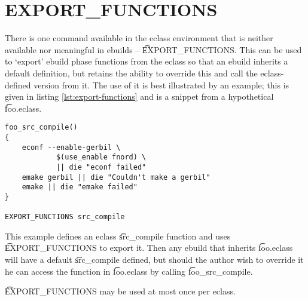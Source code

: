 \section{EXPORT\_FUNCTIONS}

There is one command available in the eclass environment that is neither available nor meaningful
in ebuilds -- \t{EXPORT\_FUNCTIONS}. This can be used to `export' ebuild phase functions from the
eclass so that an ebuild inherits a default definition, but retains the ability to override this and
call the eclass-defined version from it. The use of it is best illustrated by an example; this is
given in listing \ref{lst:export-functions} and is a snippet from a hypothetical \t{foo.eclass}.

\begin{lstlisting}[float,caption=EXPORT\_FUNCTIONS example: foo.eclass,label=lst:export-functions]
foo_src_compile()
{
    econf --enable-gerbil \
            $(use_enable fnord) \
            || die "econf failed"
    emake gerbil || die "Couldn't make a gerbil"
    emake || die "emake failed"
}

EXPORT_FUNCTIONS src_compile
\end{lstlisting}

This example defines an eclass \t{src\_compile} function and uses \t{EXPORT\_FUNCTIONS} to export
it. Then any ebuild that inherits \t{foo.eclass} will have a default \t{src\_compile} defined, but
should the author wish to override it he can access the function in \t{foo.eclass} by calling
\t{foo\_src\_compile}.

\t{EXPORT\_FUNCTIONS} may be used at most once per eclass.

